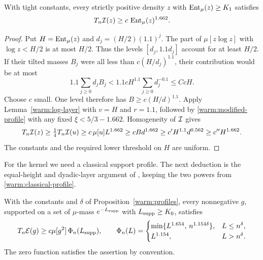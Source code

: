 \begin{lemma}\label{warm:entropy-profile}
With tight constants, every strictly positive density \(z\) with
\(\operatorname{Ent}_\mu(z)\ge K_1\) satisfies
\begin{equation}
 T_n\mathcal I(z)\ge c\,\operatorname{Ent}_\mu(z)^{1.662}.                    \label{warm:full-entropy-profile}
\end{equation}
\end{lemma}

\begin{proof}
Put \(H=\operatorname{Ent}_\mu(z)\) and \(d_j=(H/2)(1.1)^j\).
The part of \(\mu[z\log z]\) with \(\log z<H/2\) is at most \(H/2\).
Thus the levels \([d_j,1.1d_j]\) account for at least \(H/2\).
If their tilted masses \(B_j\) were all less than
\(c(H/d_j)^{1.1}\), their contribution would be at most
\[
 1.1\sum_{j\ge0}d_jB_j
 <1.1cH^{1.1}\sum_{j\ge0}d_j^{-0.1}\le CcH .
\]
Choose \(c\) small.  One level therefore has
\(B\ge c(H/d)^{1.1}\).  Apply Lemma~\ref{warm:log-layer} with \(v=H\)
and \(r=1.1\), followed by \eqref{warm:modified-profile} with any
fixed \(\xi<5/3-1.662\).  Homogeneity of \(\mathcal I\) gives
\[
 T_n\mathcal I(z)\ge\tfrac14T_n\mathcal I(u)
       \ge c\,\mu[u]L^{1.662}
       \ge cB d^{1.662}
       \ge c'H^{1.1}d^{0.562}\ge c''H^{1.662}.
\]
The constants and the required lower threshold on \(H\) are uniform.
\end{proof}

For the kernel we need a classical support profile.  The next
deduction is the equal-height and dyadic-layer argument of
\cite[Lemma~19.1]{CM}, keeping the two powers from
\eqref{warm:classical-profile}.

\begin{lemma}\label{warm:support-profile}
With the constants and \(\delta\) of Proposition~\ref{warm:profiles}, every
nonnegative \(g\), supported on a set of \(\mu\)-mass \(e^{-L_{\rm supp}}\)
with \(L_{\rm supp}\ge K_0\), satisfies
\begin{equation}
 T_n\mathcal E(g)\ge c\mu[g^2]\,\Phi_n(L_{\rm supp}),\qquad
 \Phi_n(L)=
 \begin{cases}
 \min\{L^{1.654},\,n^{1.154\delta}\},&L\le n^\delta,\\
 L^{1.154},&L>n^\delta .
 \end{cases}                                                \label{warm:support-bound}
\end{equation}
The zero function satisfies the assertion by convention.
\end{lemma}

